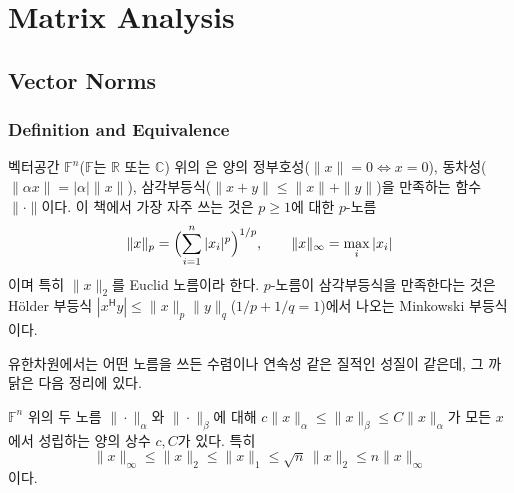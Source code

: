 \chapter{Matrix Analysis}
\label{ch:matrix-analysis}


\section{Vector Norms}
\label{sec:vector-norms}

\subsection{Definition and Equivalence}

벡터공간 $\mathbb{F}^n$($\mathbb{F}$는 $\mathbb{R}$ 또는 $\mathbb{C}$) 위의 은 양의 정부호성($\|x\|=0\iff x=0$), 동차성($\|\alpha x\|=|\alpha|\|x\|$), 삼각부등식($\|x+y\|\le\|x\|+\|y\|$)을 만족하는 함수 $\|\cdot\|$이다. 이 책에서 가장 자주 쓰는 것은 $p\ge1$에 대한 $p$-노름
\[
\|x\|_p=\Bigl(\sum_{i=1}^n|x_i|^p\Bigr)^{1/p},\qquad\|x\|_\infty=\max_i|x_i|
\]
이며 특히 $\|x\|_2$를 Euclid 노름이라 한다. $p$-노름이 삼각부등식을 만족한다는 것은 Hölder 부등식 $|x^{\mathsf H}y|\le\|x\|_p\|y\|_q$($1/p+1/q=1$)에서 나오는 Minkowski 부등식이다.

유한차원에서는 어떤 노름을 쓰든 수렴이나 연속성 같은 질적인 성질이 같은데, 그 까닭은 다음 정리에 있다.

\begin{theorem}
\label{thm:norm-equiv}
$\mathbb{F}^n$ 위의 두 노름 $\|\cdot\|_\alpha$와 $\|\cdot\|_\beta$에 대해 $c\|x\|_\alpha\le\|x\|_\beta\le C\|x\|_\alpha$가 모든 $x$에서 성립하는 양의 상수 $c,C$가 있다. 특히
\[
\|x\|_\infty\le\|x\|_2\le\|x\|_1\le\sqrt n\,\|x\|_2\le n\|x\|_\infty
\]
이다.
\end{theorem}

